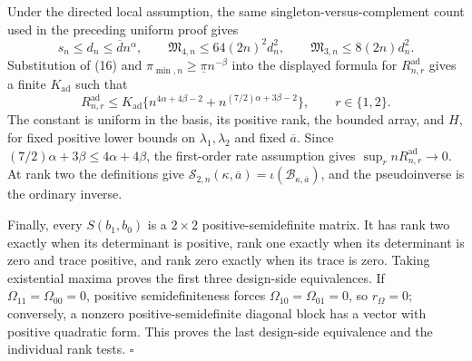 Under the directed local assumption, the same singleton-versus-complement count used in the preceding uniform proof gives
\[
s_n\le d_n\le\overline d n^\alpha,
\qquad
\mathfrak M_{4,n}\le64(2n)^2d_n^2,
\qquad
\mathfrak M_{3,n}\le8(2n)d_n^2.
\tag{16}
\]
Substitution of (16) and \(\pi_{\min,n}\ge\underline\pi n^{-\beta}\) into the displayed formula for \(R_{n,r}^{\mathrm{ad}}\) gives a finite \(K_{\mathrm{ad}}\) such that
\[
R_{n,r}^{\mathrm{ad}}
\le K_{\mathrm{ad}}\{n^{4\alpha+4\beta-2}
+n^{(7/2)\alpha+3\beta-2}\},
\qquad r\in\{1,2\}.
\tag{17}
\]
The constant is uniform in the basis, its positive rank, the bounded array, and \(H\), for fixed positive lower bounds on \(\lambda_1,\lambda_2\) and fixed \(\overline a\).  Since \((7/2)\alpha+3\beta\le4\alpha+4\beta\), the first-order rate assumption gives \(\sup_r nR_{n,r}^{\mathrm{ad}}\to0\).  At rank two the definitions give \(\mathcal S_{2,n}(\kappa,\overline a)=\iota(\mathcal B_{\kappa,\overline a})\), and the pseudoinverse is the ordinary inverse.

Finally, every \(S(b_1,b_0)\) is a \(2\times2\) positive-semidefinite matrix.  It has rank two exactly when its determinant is positive, rank one exactly when its determinant is zero and trace positive, and rank zero exactly when its trace is zero.  Taking existential maxima proves the first three design-side equivalences.  If \(\Omega_{11}=\Omega_{00}=0\), positive semidefiniteness forces \(\Omega_{10}=\Omega_{01}=0\), so \(r_\Omega=0\); conversely, a nonzero positive-semidefinite diagonal block has a vector with positive quadratic form.  This proves the last design-side equivalence and the individual rank tests. \(\square\)